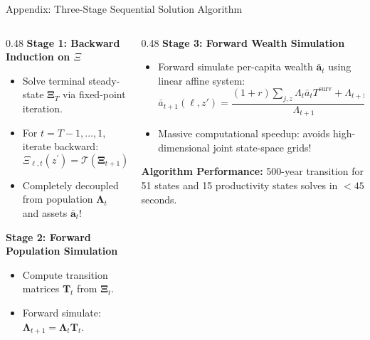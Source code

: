 \documentclass[aspectratio=169, 10pt]{beamer}
\begin{document}
\begin{frame}{Appendix: Three-Stage Sequential Solution Algorithm \hfill \hyperlink{main:agg_dynamics}{\scriptsize{}}}\label{backup:solution_algo}
    \begin{columns}[T]
        \begin{column}{0.48\textwidth}
            \textbf{\small Stage 1: Backward Induction on $\Xi$}
            \vspace{0.04cm}
            \begin{itemize}\scriptsize\setlength{\itemsep}{2pt}
                \item Solve terminal steady-state $\boldsymbol{\Xi}_T$ via fixed-point iteration.
                \item For $t = T-1, \dots, 1$, iterate backward:
                $$\Xi_{\ell,t}(z^\prime) = \mathcal{T}\left(\boldsymbol{\Xi}_{t+1}\right)$$
                \item Completely decoupled from population $\boldsymbol{\Lambda}_t$ and assets $\bar{\mathbf{a}}_t$!
            \end{itemize}
            \vspace{0.04cm}
            \textbf{\small Stage 2: Forward Population Simulation}
            \vspace{0.04cm}
            \begin{itemize}\scriptsize\setlength{\itemsep}{2pt}
                \item Compute transition matrices $\mathbf{T}_t$ from $\boldsymbol{\Xi}_t$.
                \item Forward simulate: $\boldsymbol{\Lambda}_{t+1} = \boldsymbol{\Lambda}_t \mathbf{T}_t$.
            \end{itemize}
        \end{column}
        \begin{column}{0.48\textwidth}
            \textbf{\small Stage 3: Forward Wealth Simulation}
            \vspace{0.04cm}
            \begin{itemize}\scriptsize\setlength{\itemsep}{2pt}
                \item Forward simulate per-capita wealth $\bar{\mathbf{a}}_t$ using linear affine system:
                {\tiny
                $$\bar{a}_{t+1}(\ell,z') = \frac{(1+r)\sum_{j,z}\Lambda_t \bar a_t T^{\text{surv}} + \Lambda_{t+1} S_t}{\Lambda_{t+1}}$$
                }
                \item Massive computational speedup: avoids high-dimensional joint state-space grids!
            \end{itemize}
            \vspace{0.04cm}
            \begin{tcolorbox}[leafbox]
                \tiny \textbf{Algorithm Performance:} 500-year transition for 51 states and 15 productivity states solves in $<45$ seconds.
            \end{tcolorbox}
        \end{column}
    \end{columns}
\end{frame}
\end{document}
